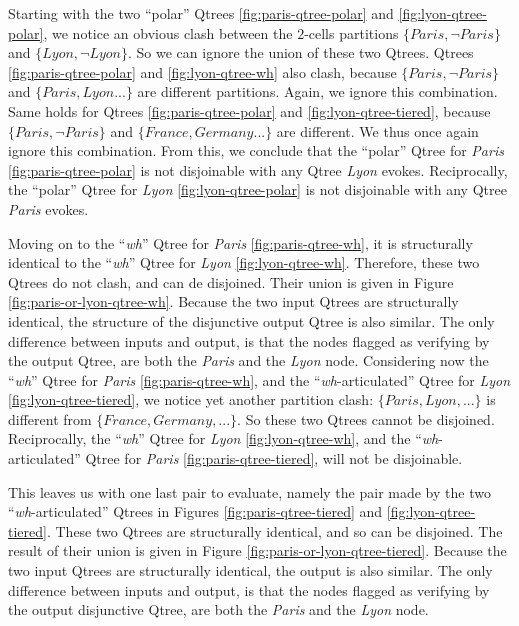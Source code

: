 Starting with the two ``polar'' Qtrees \ref{fig:paris-qtree-polar} and \ref{fig:lyon-qtree-polar}, we notice an obvious clash between the $2$-cells partitions $\lbrace \textit{Paris}, \neg\textit{Paris}\rbrace$ and $\lbrace \textit{Lyon}, \neg\textit{Lyon}\rbrace$. So we can ignore the union of these two Qtrees. Qtrees \ref{fig:paris-qtree-polar} and \ref{fig:lyon-qtree-wh} also clash, because $\lbrace \textit{Paris}, \neg\textit{Paris}\rbrace$ and $\lbrace \textit{Paris}, \textit{Lyon} ...\rbrace$ are different partitions. Again, we ignore this combination. Same holds for Qtrees \ref{fig:paris-qtree-polar} and \ref{fig:lyon-qtree-tiered}, because $\lbrace \textit{Paris}, \neg\textit{Paris}\rbrace$ and $\lbrace \textit{France}, \textit{Germany} ...\rbrace$ are different. We thus once again ignore this combination. From this, we conclude that the ``polar'' Qtree  for \textit{Paris} \ref{fig:paris-qtree-polar} is not disjoinable with any Qtree \textit{Lyon} evokes. Reciprocally, the ``polar'' Qtree  for \textit{Lyon} \ref{fig:lyon-qtree-polar} is not disjoinable with any Qtree \textit{Paris} evokes. 

Moving on to the ``\textit{wh}'' Qtree for \textit{Paris} \ref{fig:paris-qtree-wh}, it is structurally identical to the ``\textit{wh}'' Qtree for \textit{Lyon} \ref{fig:lyon-qtree-wh}. Therefore, these two Qtrees do not clash, and can de disjoined. Their union is given in Figure \ref{fig:paris-or-lyon-qtree-wh}. Because the two input Qtrees are structurally identical, the structure of the disjunctive output Qtree is also similar. The only difference between inputs and output, is that the nodes flagged as verifying by the output Qtree, are both the \textit{Paris} and the \textit{Lyon} node. Considering now the ``\textit{wh}'' Qtree for \textit{Paris} \ref{fig:paris-qtree-wh}, and the ``\textit{wh}-articulated'' Qtree for \textit{Lyon} \ref{fig:lyon-qtree-tiered}, we notice yet another partition clash: $\lbrace \textit{Paris}, \textit{Lyon}, ...\rbrace$ is different from $\lbrace\textit{France}, \textit{Germany}, ... \rbrace$. So these two Qtrees cannot be disjoined. Reciprocally, the ``\textit{wh}'' Qtree for \textit{Lyon} \ref{fig:lyon-qtree-wh}, and the ``\textit{wh}-articulated'' Qtree for \textit{Paris} \ref{fig:paris-qtree-tiered}, will not be disjoinable.

This leaves us with one last pair to evaluate, namely the pair made by the two ``\textit{wh}-articulated'' Qtrees in Figures \ref{fig:paris-qtree-tiered} and \ref{fig:lyon-qtree-tiered}. These two Qtrees are structurally identical, and so can be disjoined. The result of their union is given in Figure \ref{fig:paris-or-lyon-qtree-tiered}. Because the two input Qtrees are structurally identical, the output is also similar. The only difference between inputs and output, is that the nodes flagged as verifying by the output disjunctive Qtree, are both the \textit{Paris} and the \textit{Lyon} node.

